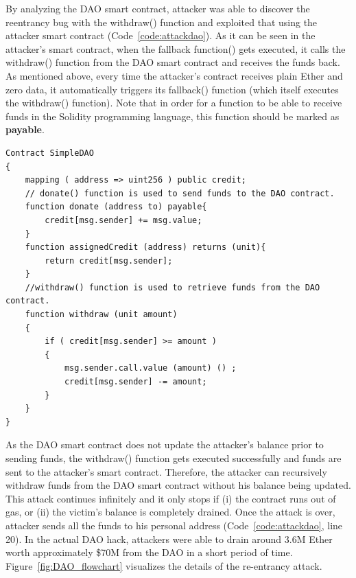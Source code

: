 By analyzing the DAO smart contract, attacker was able to discover the reentrancy bug with the withdraw() function and exploited that using the attacker smart contract (Code~\ref{code:attackdao}). As it can be seen in the attacker’s smart contract, when the fallback function() gets executed, it calls the withdraw() function from the DAO smart contract and receives the funds back. As mentioned above, every time the attacker’s contract receives plain Ether and zero data, it automatically triggers its fallback() function (which itself executes the withdraw() function). Note that in order for a function to be able to receive funds in the Solidity programming language, this function should be marked as \textbf{payable}.

\begin{lstlisting}[basicstyle=\scriptsize\ttfamily,caption={The simplified version of the DAO smart contract that is vulnerable to the re-entrancy attack.},label={code:dao},float]
Contract SimpleDAO 
{
	mapping ( address => uint256 ) public credit;   
	// donate() function is used to send funds to the DAO contract.
	function donate (address to) payable{
		credit[msg.sender] += msg.value;
	}	
	function assignedCredit (address) returns (unit){
		return credit[msg.sender];
	}
	//withdraw() function is used to retrieve funds from the DAO contract.
	function withdraw (unit amount)
	{	
		if ( credit[msg.sender] >= amount )
		{	
			msg.sender.call.value (amount) () ;
			credit[msg.sender] -= amount;
		}
	}              
}
\end{lstlisting}

As the DAO smart contract does not update the attacker’s balance prior to sending funds, the withdraw() function gets executed successfully and funds are sent to the attacker’s smart contract. Therefore, the attacker can recursively withdraw funds from the DAO smart contract without his balance being updated. This attack continues infinitely and it only stops if (i) the contract runs out of gas, or (ii) the victim’s balance is completely drained. Once the attack is over, attacker sends all the funds to his personal address (Code~\ref{code:attackdao}, line 20). In the actual DAO hack, attackers were able to drain around 3.6M Ether worth approximately \$70M from the DAO in a short period of time. Figure~\ref{fig:DAO_flowchart} visualizes the details of the re-entrancy attack.

